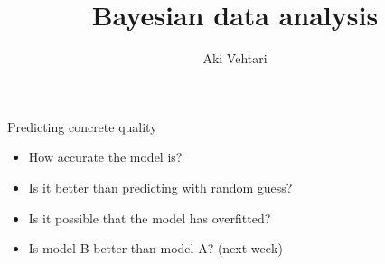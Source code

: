 \documentclass[english,t]{beamer}
\title[]{Bayesian data analysis}
\subtitle{}
\author{Aki Vehtari}
\institute[Aalto]{}
\date[]{}
\begin{document}
 
\begin{frame}{Predicting concrete quality}


    \begin{itemize}
    \item How accurate the model is?
    \item Is it better than predicting with random guess?
    \item Is it possible that the model has overfitted?
    \item Is model B better than model A? (next week)
    \end{itemize}
\end{frame}
\end{document}
